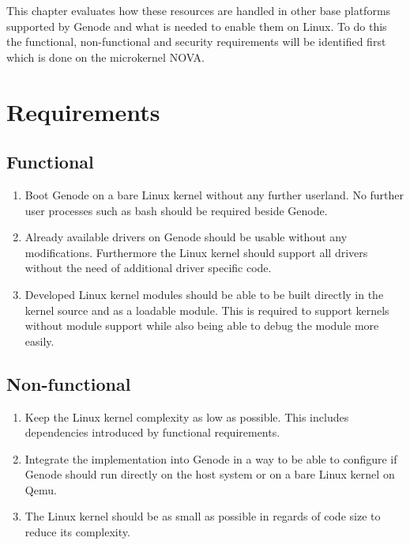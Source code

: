 \documentclass[
a4paper,
11pt,
twoside
]{report}
\begin{document}
		This chapter evaluates how these resources are handled in other base platforms supported by Genode and what is needed to enable them on Linux.
		To do this the functional, non-functional and security requirements will be identified first which is done on the microkernel NOVA.
		
		\section{Requirements}
		
		
		
		\subsection{Functional}
		
		\begin{enumerate}
			\item \label{req:boot} Boot Genode on a bare  Linux kernel without any further userland.
			No further user processes such as bash should be required beside Genode.
			\item \label{req:drivers} Already available drivers on Genode should be usable without any modifications.
			Furthermore the Linux kernel should support all drivers without the need of additional driver specific code.
			\item \label{req:modules} Developed Linux kernel modules should be able to be built directly in the kernel source and as a loadable module.
			This is required to support kernels without module support while also being able to debug the module more easily.
		\end{enumerate}
		
		\subsection{Non-functional}
		
		\begin{enumerate}
			\item \label{req:complexity} Keep the Linux kernel complexity as low as possible.
			This includes dependencies introduced by functional requirements.
			\item \label{req:integration} Integrate the implementation into Genode in a way to be able to configure if Genode should run directly on the host system or on a bare Linux kernel on Qemu.
			\item \label{req:size} The Linux kernel should be as small as possible in regards of code size to reduce its complexity.
		\end{enumerate}
		
\end{document}
